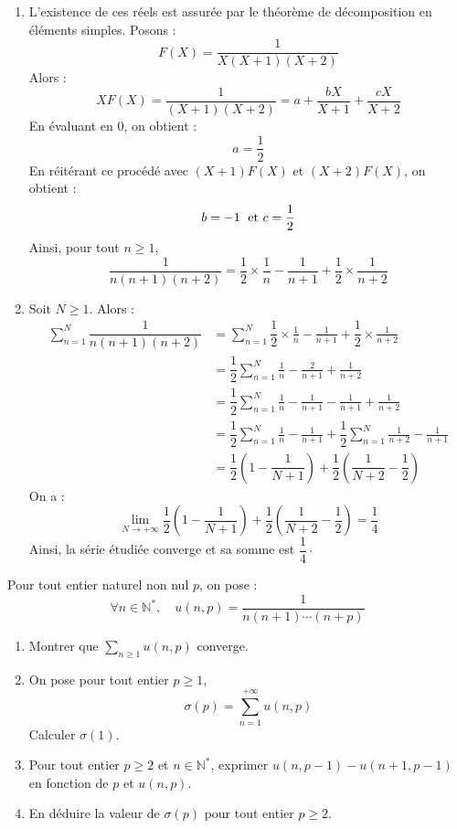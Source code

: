 \documentclass[a4paper,10pt]{report}
\newcommand{\Sum}[2]{\ensuremath{\textstyle{\sum\limits_{#1}^{#2}}}}
\begin{document}
\corr 
\begin{enumerate}
\item L'existence de ces réels est assurée par le théorème de décomposition en éléments simples. Posons :
$$ F(X) = \dfrac{1}{X(X+1)(X+2)}$$
Alors :
$$ XF(X) = \dfrac{1}{(X+1)(X+2)} = a + \dfrac{bX}{X+1} + \dfrac{cX}{X+2}$$
En évaluant en $0$, on obtient :
$$ a = \dfrac{1}{2}$$
En réitérant ce procédé avec $(X+1)F(X)$ et $(X+2)F(X)$, on obtient :
$$ b = -1 \; \hbox{ et } c = \dfrac{1}{2}$$
Ainsi, pour tout $n \geq 1$,
$$  \frac{1}{n(n+1)(n+2)} = \dfrac{1}{2} \times \frac{1}{n} - \frac{1}{n+1}  +\dfrac{1}{2} \times \frac{1}{n+2}$$
\item Soit $N \geq 1$. Alors :
\begin{align*}
\sum_{n=1}^N \dfrac{1}{n(n+1)(n+2)} & = \sum_{n=1}^N  \dfrac{1}{2} \times \frac{1}{n} - \frac{1}{n+1} + \dfrac{1}{2} \times \frac{1}{n+2} \\
& = \dfrac{1}{2} \sum_{n=1}^N  \frac{1}{n} - \frac{2}{n+1}  +\frac{1}{n+2} \\
& = \dfrac{1}{2} \sum_{n=1}^N  \frac{1}{n} - \frac{1}{n+1} - \frac{1}{n+1}  + \frac{1}{n+2} \\
& =  \dfrac{1}{2} \sum_{n=1}^N  \frac{1}{n} - \frac{1}{n+1} +  \dfrac{1}{2} \sum_{n=1}^N   \frac{1}{n+2} - \frac{1}{n+1}  \\
& = \dfrac{1}{2} \left(1 - \dfrac{1}{N+1} \right) + \dfrac{1}{2} \left( \dfrac{1}{N+2} - \dfrac{1}{2} \right)
\end{align*}
On a :
$$ \lim_{N \rightarrow + \infty} \dfrac{1}{2} \left(1 - \dfrac{1}{N+1} \right) + \dfrac{1}{2} \left( \dfrac{1}{N+2} - \dfrac{1}{2} \right) = \dfrac{1}{4}$$
Ainsi, la série étudiée converge et sa somme est $\dfrac{1}{4} \cdot$
\end{enumerate}

\medskip


\begin{Exa} Pour tout entier naturel non nul $p$, on pose :
$$ \forall n \in \mathbb{N}^*, \quad u(n,p) = \frac{1}{n(n+1)\cdots(n+p)}$$

\begin{enumerate}
\item Montrer que $\Sum{n \geq 1}{}  u(n,p)$ converge.
\item On pose pour tout entier $p \geq 1$,
$$ \sigma(p) = \sum_{n=1}^{+ \infty} u(n,p)$$
Calculer $\sigma(1)$.
\item Pour tout entier $p \geq 2$ et $n \in \mathbb{N}^*$, exprimer $u(n,p-1)-u(n+1,p-1)$ en fonction de $p$ et $u(n,p)$.
\item En déduire la valeur de $\sigma(p)$ pour tout entier $p \geq 2$.
\end{enumerate}
\end{Exa}
\end{document}
